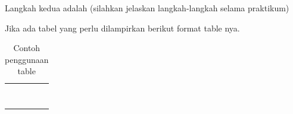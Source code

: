 \newpage %
\item Langkah kedua adalah (silahkan jelaskan langkah-langkah
      selama praktikum)

      Jika ada tabel yang perlu dilampirkan berikut format table nya.

      \begin{table}[H]
        \centering
        \caption{Contoh penggunaan table}
        \linespread{1}\fontsize{8}{10}\selectfont
        \setlength{\tabcolsep}{3pt}
        \renewcommand{\arraystretch}{0.9}
        \begin{tabular}{!{\color{tabline}\vrule}>{\centering\arraybackslash}p{9mm}!{\color{tabline}\vrule}p{30mm}!{\color{tabline}\vrule}p{30mm}!{\color{tabline}\vrule}p{30mm}!{\color{tabline}\vrule}}
          \hline
           &  &  &  \\
          \hline
          & & & \\ \hline
          & & & \\ \hline
          & & & \\ \hline
          & & & \\ \hline
          & & & \\ \hline
          & & & \\ \hline
          & & & \\ \hline
          & & & \\ \hline
        \end{tabular}
      \end{table}